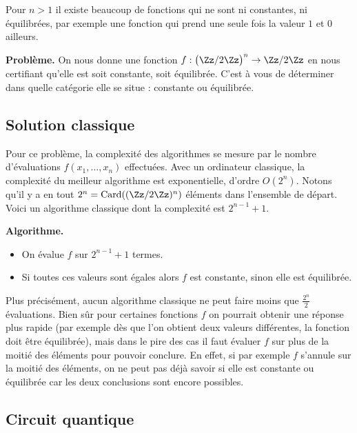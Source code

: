 \documentclass[11pt,class=report,crop=false]{standalone}
\begin{document}
Pour $n>1$ il existe beaucoup de fonctions qui ne sont ni constantes, ni équilibrées, par exemple une fonction qui prend une seule fois la valeur $1$ et $0$ ailleurs.

\textbf{Problème.} On nous donne une fonction $f : \big(\Zz/2\Zz\big)^n \to \Zz/2\Zz$ en nous certifiant qu'elle est soit constante, soit équilibrée. C'est à vous de déterminer dans quelle catégorie elle se situe : constante ou équilibrée.



\subsection{Solution classique}

Pour ce problème, la complexité des algorithmes se mesure par le nombre d'évaluations $f(x_1,\ldots,x_n)$ effectuées.
Avec un ordinateur classique, la complexité du meilleur algorithme est exponentielle, d'ordre $O(2^n)$.
Notons qu'il y a en tout $2^n = \operatorname{Card}((\Zz/2\Zz)^n)$ éléments dans l'ensemble de départ. 
Voici un algorithme classique dont la complexité est $2^{n-1}+1$.

\medskip

\textbf{Algorithme.}
\begin{itemize}
  \item On évalue $f$ sur $2^{n-1}+1$ termes.
  \item Si toutes ces valeurs sont égales alors $f$ est constante, sinon elle est équilibrée.
\end{itemize}

\medskip

Plus précisément, aucun algorithme classique ne peut faire moins que $\frac{2^n}{2}$ évaluations.
Bien sûr pour certaines fonctions $f$ on pourrait obtenir une réponse plus rapide (par exemple dès que l'on obtient deux valeurs différentes, la fonction doit être équilibrée), mais dans le pire des cas il faut évaluer $f$ sur plus de la moitié des éléments pour pouvoir conclure. En effet, si par exemple $f$ s'annule sur la moitié des éléments, on ne peut pas déjà savoir si elle est constante ou équilibrée car les deux conclusions sont encore possibles.

\subsection{Circuit quantique}
\end{document}
